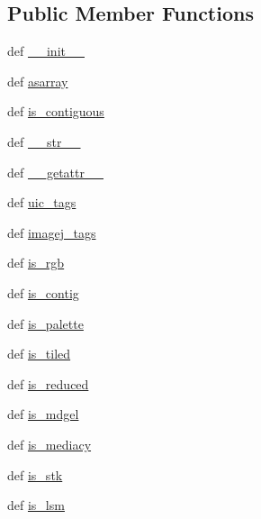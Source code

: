 \subsection*{Public Member Functions}
\begin{DoxyCompactItemize}
\item 
def \hyperlink{classtifffile_1_1_tiff_page_a91ce69df8f42151984d02d4054908c13}{\-\_\-\-\_\-init\-\_\-\-\_\-}
\item 
def \hyperlink{classtifffile_1_1_tiff_page_a5953a258881256d704bd3d0c34a09bea}{asarray}
\item 
def \hyperlink{classtifffile_1_1_tiff_page_ad0679ea4c15ca29548ae87e4986a7811}{is\-\_\-contiguous}
\item 
def \hyperlink{classtifffile_1_1_tiff_page_af0e5e72edfa67d9f1239b194cbd7a56b}{\-\_\-\-\_\-str\-\_\-\-\_\-}
\item 
def \hyperlink{classtifffile_1_1_tiff_page_a43cd8883f12805d887c2994582110e42}{\-\_\-\-\_\-getattr\-\_\-\-\_\-}
\item 
def \hyperlink{classtifffile_1_1_tiff_page_a56fb86bb7966d84b7b72d1edc297eaed}{uic\-\_\-tags}
\item 
def \hyperlink{classtifffile_1_1_tiff_page_acd582c08af3fc15fa22bbc4f6b7d4a4d}{imagej\-\_\-tags}
\item 
def \hyperlink{classtifffile_1_1_tiff_page_aad80ffe0eb6611da60f78ad2743298a0}{is\-\_\-rgb}
\item 
def \hyperlink{classtifffile_1_1_tiff_page_a1af194b01da49777e8d7585a987f6ccf}{is\-\_\-contig}
\item 
def \hyperlink{classtifffile_1_1_tiff_page_aca723b525070789164837eb2ce3b366f}{is\-\_\-palette}
\item 
def \hyperlink{classtifffile_1_1_tiff_page_afcf12e643a6207d0a02184ab19485489}{is\-\_\-tiled}
\item 
def \hyperlink{classtifffile_1_1_tiff_page_af5f9892583d02082fd1be22ebe653a28}{is\-\_\-reduced}
\item 
def \hyperlink{classtifffile_1_1_tiff_page_a11f2d006bbe32f212252c65a9bb9adcb}{is\-\_\-mdgel}
\item 
def \hyperlink{classtifffile_1_1_tiff_page_a664758db65e7865792cc53dd01946054}{is\-\_\-mediacy}
\item 
def \hyperlink{classtifffile_1_1_tiff_page_a7e17dfd14c887008863f4f800e701df1}{is\-\_\-stk}
\item 
def \hyperlink{classtifffile_1_1_tiff_page_a22c271c0c693e40335409c006dc6fb0b}{is\-\_\-lsm}
\item 

\end{DoxyCompactItemize}
